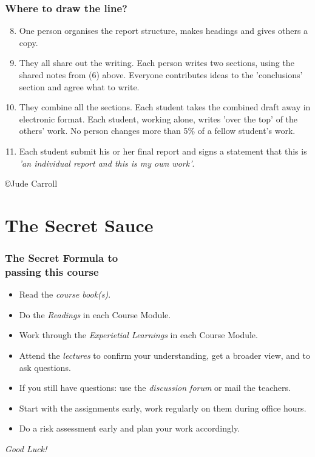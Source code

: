 \documentclass[10pt]{beamer}
\begin{document}
\begin{frame}[t]
\frametitle{Where to draw the line?}
\begin{enumerate}
\setcounter{enumi}{7}
\item One person organises the report structure, makes headings and gives others a copy.
\item They all share out the writing. Each person writes two sections, using the shared notes from (6) above. Everyone contributes ideas to the 'conclusions' section and agree what to write.
\item They combine all the sections. Each student takes the combined draft away in electronic format. Each student, working alone, writes 'over the top' of the others' work. No person changes more than 5\% of a fellow student's work.
\item Each student submit his or her final report and signs a statement that this is \emph{'an individual report and this is my own work'}.
\end{enumerate}
\begin{scriptsize}
\copyright Jude Carroll
\end{scriptsize}
\end{frame}

\section{The Secret Sauce}
\begin{frame}[t]
\frametitle{The Secret Formula to\\ passing this course}
\begin{itemize}
\item Read the \emph{course book(s)}.
\item Do the \emph{Readings} in each Course Module.
\item Work through the \emph{Experietial Learnings} in each Course Module.
\item Attend the \emph{lectures} to confirm your understanding, get a broader view, and to ask questions.
\item If you still have questions: use the \emph{discussion forum} or mail the teachers.
\item Start with the assignments early, {work regularly} on them during office hours.
\item Do a {risk assessment} early and {plan your work} accordingly.
\end{itemize}

{\Large\em Good Luck!}

\end{frame}
\end{document}
